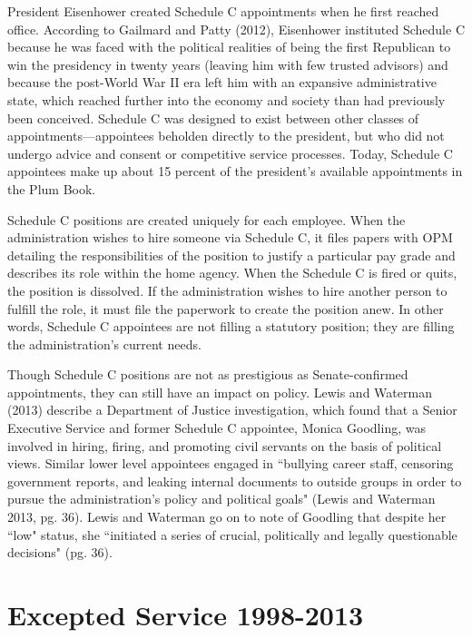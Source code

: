 \documentclass[12pt]{article}
\begin{document}
	President Eisenhower created Schedule C appointments when he first reached office. According to Gailmard and Patty (2012), Eisenhower instituted Schedule C because he was faced with the political realities of being the first Republican to win the presidency in twenty years (leaving him with few trusted advisors) and because the post-World War II era left him with an expansive administrative state, which reached further into the economy and society than had previously been conceived. Schedule C was designed to exist between other classes of appointments---appointees beholden directly to the president, but who did not undergo advice and consent or competitive service processes. Today, Schedule C appointees make up about 15 percent of the president's available appointments in the Plum Book.
	
	Schedule C positions are created uniquely for each employee. When the administration wishes to hire someone via Schedule C, it files papers with OPM detailing the responsibilities of the position to justify a particular pay grade and describes its role within the home agency. When the Schedule C is fired or quits, the position is dissolved. If the administration wishes to hire another person to fulfill the role, it must file the paperwork to create the position anew. In other words, Schedule C appointees are not filling a statutory position; they are filling the administration's current needs.	
	
	Though Schedule C positions are not as prestigious as Senate-confirmed appointments, they can still have an impact on policy. Lewis and Waterman (2013) describe a Department of Justice investigation, which found that a Senior Executive Service and former Schedule C appointee, Monica Goodling, was involved in hiring, firing, and promoting civil servants on the basis of political views. Similar lower level appointees engaged in ``bullying career staff, censoring government reports, and leaking internal documents to outside groups in order to pursue the administration's policy and political goals" (Lewis and Waterman 2013, pg. 36). Lewis and Waterman go on to note of Goodling that despite her ``low" status, she ``initiated a series of crucial, politically and legally questionable decisions" (pg. 36). 
	
\section*{Excepted Service 1998-2013}
\end{document}

